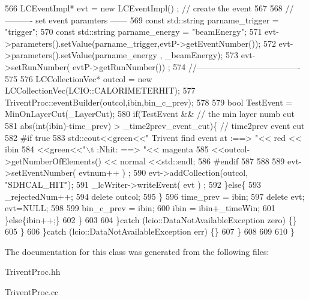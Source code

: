\begin{DoxyCode}
566               LCEventImpl*  evt = \textcolor{keyword}{new} LCEventImpl() ;     \textcolor{comment}{// create the event}
567               
568               \textcolor{comment}{//---------- set event paramters ------}
569               \textcolor{keyword}{const} std::string parname\_trigger = \textcolor{stringliteral}{"trigger"};
570               \textcolor{keyword}{const} std::string parname\_energy  = \textcolor{stringliteral}{"beamEnergy"};
571               evt->parameters().setValue(parname\_trigger,evtP->getEventNumber()); 
572               evt->parameters().setValue(parname\_energy , \_beamEnergy); 
573               evt->setRunNumber( evtP->getRunNumber()) ;
574               \textcolor{comment}{//-------------------------------------}
575               
576               LCCollectionVec* outcol = \textcolor{keyword}{new} LCCollectionVec(LCIO::CALORIMETERHIT);
577               TriventProc::eventBuilder(outcol,ibin,bin\_c\_prev);
578               
579               \textcolor{keywordtype}{bool} TestEvent = MinOnLayerCut(\_LayerCut);
580               \textcolor{keywordflow}{if}(TestEvent &&                                  \textcolor{comment}{// the min layer numb cut       }
581                  abs(\textcolor{keywordtype}{int}(ibin)-time\_prev) > \_time2prev\_event\_cut)\{ \textcolor{comment}{// time2prev event  cut }
582 \textcolor{preprocessor}{#if true                }
583 \textcolor{preprocessor}{}                std::cout<<green<<\textcolor{stringliteral}{" Trivent find event at :==> "}<< red << ibin 
584                          <<green<<\textcolor{stringliteral}{"\(\backslash\)t :Nhit: ==> "}<< magenta
585                          <<outcol->getNumberOfElements() << normal <<std::endl;  
586 \textcolor{preprocessor}{#endif }
587 \textcolor{preprocessor}{}                
588                 
589                 evt->setEventNumber( evtnum++ ) ;
590                 evt->addCollection(outcol, \textcolor{stringliteral}{"SDHCAL\_HIT"});
591                 \_lcWriter->writeEvent( evt ) ;
592               \}\textcolor{keywordflow}{else}\{
593                 \_rejectedNum++;
594                 \textcolor{keyword}{delete} outcol;
595               \}
596               time\_prev = ibin;
597               \textcolor{keyword}{delete} evt; evt=NULL;
598               
599               bin\_c\_prev = ibin;
600               ibin = ibin+\_timeWin;
601             \}\textcolor{keywordflow}{else}\{ibin++;\}
602           \}
603           
604         \}\textcolor{keywordflow}{catch} (lcio::DataNotAvailableException zero) \{\}
605       \}
606     \}\textcolor{keywordflow}{catch} (lcio::DataNotAvailableException err) \{\}
607   \}
608   
609            
610 \}       
\end{DoxyCode}


The documentation for this class was generated from the following files\-:\begin{DoxyCompactItemize}
\item 
Trivent\-Proc.\-hh\item 
Trivent\-Proc.\-cc\end{DoxyCompactItemize}

